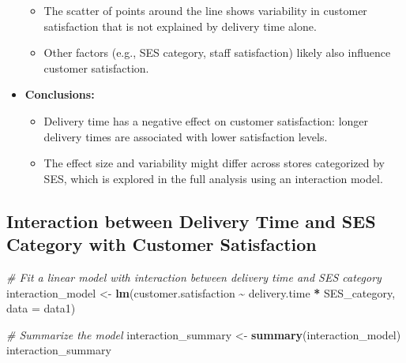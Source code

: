 \documentclass[
]{article}
\newenvironment{Shaded}{\begin{snugshade}}{\end{snugshade}}
\newcommand{\AttributeTok}[1]{\textcolor[rgb]{0.13,0.29,0.53}{#1}}
\newcommand{\CommentTok}[1]{\textcolor[rgb]{0.56,0.35,0.01}{\textit{#1}}}
\newcommand{\FunctionTok}[1]{\textcolor[rgb]{0.13,0.29,0.53}{\textbf{#1}}}
\newcommand{\NormalTok}[1]{#1}
\newcommand{\OtherTok}[1]{\textcolor[rgb]{0.56,0.35,0.01}{#1}}
\newcommand{\SpecialCharTok}[1]{\textcolor[rgb]{0.81,0.36,0.00}{\textbf{#1}}}
\providecommand{\tightlist}{%
  \setlength{\itemsep}{0pt}\setlength{\parskip}{0pt}}
\begin{document}
\begin{itemize}
  \begin{itemize}
  \tightlist
  \item
    The scatter of points around the line shows variability in customer
    satisfaction that is not explained by delivery time alone.
  \item
    Other factors (e.g., SES category, staff satisfaction) likely also
    influence customer satisfaction.
  \end{itemize}
\item
  \textbf{Conclusions:}

  \begin{itemize}
  \tightlist
  \item
    Delivery time has a negative effect on customer satisfaction: longer
    delivery times are associated with lower satisfaction levels.
  \item
    The effect size and variability might differ across stores
    categorized by SES, which is explored in the full analysis using an
    interaction model.
  \end{itemize}
\end{itemize}

\subsection{Interaction between Delivery Time and SES Category with
Customer
Satisfaction}\label{interaction-between-delivery-time-and-ses-category-with-customer-satisfaction}

\begin{Shaded}
\begin{Highlighting}[]
\CommentTok{\# Fit a linear model with interaction between delivery time and SES category}
\NormalTok{interaction\_model }\OtherTok{\textless{}{-}} \FunctionTok{lm}\NormalTok{(customer.satisfaction }\SpecialCharTok{\textasciitilde{}}\NormalTok{ delivery.time }\SpecialCharTok{*}\NormalTok{ SES\_category, }\AttributeTok{data =}\NormalTok{ data1)}

\CommentTok{\# Summarize the model}
\NormalTok{interaction\_summary }\OtherTok{\textless{}{-}} \FunctionTok{summary}\NormalTok{(interaction\_model)}
\NormalTok{interaction\_summary}
\end{Highlighting}
\end{Shaded}
\end{document}
